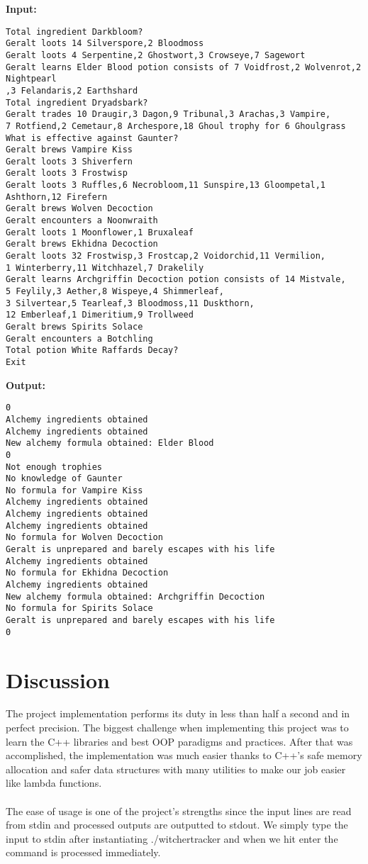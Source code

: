 \documentclass[a4paper,12pt]{article}
\begin{document}
\textbf{Input:}
\begin{verbatim}
Total ingredient Darkbloom?
Geralt loots 14 Silverspore,2 Bloodmoss
Geralt loots 4 Serpentine,2 Ghostwort,3 Crowseye,7 Sagewort
Geralt learns Elder Blood potion consists of 7 Voidfrost,2 Wolvenrot,2 Nightpearl
,3 Felandaris,2 Earthshard
Total ingredient Dryadsbark?
Geralt trades 10 Draugir,3 Dagon,9 Tribunal,3 Arachas,3 Vampire,
7 Rotfiend,2 Cemetaur,8 Archespore,18 Ghoul trophy for 6 Ghoulgrass
What is effective against Gaunter?
Geralt brews Vampire Kiss
Geralt loots 3 Shiverfern
Geralt loots 3 Frostwisp
Geralt loots 3 Ruffles,6 Necrobloom,11 Sunspire,13 Gloompetal,1 Ashthorn,12 Firefern
Geralt brews Wolven Decoction
Geralt encounters a Noonwraith
Geralt loots 1 Moonflower,1 Bruxaleaf
Geralt brews Ekhidna Decoction
Geralt loots 32 Frostwisp,3 Frostcap,2 Voidorchid,11 Vermilion,
1 Winterberry,11 Witchhazel,7 Drakelily
Geralt learns Archgriffin Decoction potion consists of 14 Mistvale,
5 Feylily,3 Aether,8 Wispeye,4 Shimmerleaf,
3 Silvertear,5 Tearleaf,3 Bloodmoss,11 Duskthorn,
12 Emberleaf,1 Dimeritium,9 Trollweed
Geralt brews Spirits Solace
Geralt encounters a Botchling
Total potion White Raffards Decay?
Exit
\end{verbatim}

\textbf{Output:}
\begin{verbatim}
0
Alchemy ingredients obtained
Alchemy ingredients obtained
New alchemy formula obtained: Elder Blood
0
Not enough trophies
No knowledge of Gaunter
No formula for Vampire Kiss
Alchemy ingredients obtained
Alchemy ingredients obtained
Alchemy ingredients obtained
No formula for Wolven Decoction
Geralt is unprepared and barely escapes with his life
Alchemy ingredients obtained
No formula for Ekhidna Decoction
Alchemy ingredients obtained
New alchemy formula obtained: Archgriffin Decoction
No formula for Spirits Solace
Geralt is unprepared and barely escapes with his life
0
\end{verbatim}

\section{Discussion}
The project implementation performs its duty in less than half a second and in perfect precision. The biggest challenge when implementing this project was to learn the C++ libraries and best OOP paradigms and practices. After that was accomplished, the implementation was much easier thanks to C++’s safe memory allocation and safer data structures with many utilities to make our job easier like lambda functions.\\\\ The ease of usage is one of the project's strengths since the input lines are read from stdin and processed outputs are outputted to stdout. We simply type the input to stdin after instantiating ./witchertracker and when we hit enter the command is processed immediately.
\end{document}

